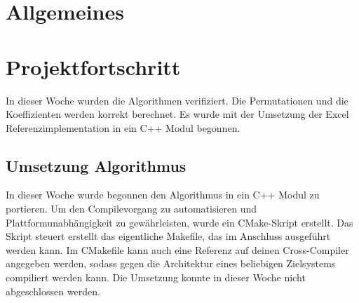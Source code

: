 \documentclass[a4paper,12pt,fleqn]{article}
\begin{document}
\setlength{\headheight}{36pt}

\begin{titlepage}



\end{titlepage}

\section[Allgemeines]{Allgemeines}
%
\section[Fortschritt]{Projektfortschritt}
%
In dieser Woche wurden die Algorithmen verifiziert. Die Permutationen und die Koeffizienten werden korrekt berechnet. Es wurde mit der Umsetzung der Excel Referenzimplementation in ein C++ Modul begonnen.
%
\subsection{Umsetzung Algorithmus}
In dieser Woche wurde begonnen den Algorithmus in ein C++ Modul zu portieren. Um den Compilevorgang zu automatisieren und Plattformunabhängigkeit zu gewährleisten, wurde ein CMake-Skript erstellt. Das Skript steuert erstellt das eigentliche Makefile, das im Anschluss ausgeführt werden kann. Im CMakefile kann auch eine Referenz auf deinen Cross-Compiler angegeben werden, sodass gegen die Architektur eines beliebigen Zielsystems compiliert werden kann. Die Umsetzung konnte in dieser Woche nicht abgeschlossen werden.
%
\end{document}
